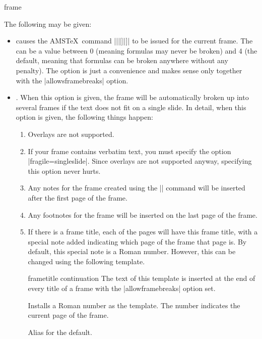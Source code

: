 \begin{environment}{{frame}%
    }
\begin{frame}[<+->][plain]
\begin{frame}[plain]
  The following  may be given:
  \begin{itemize}
  \item
     causes the AMS\TeX\ command
    |\allowdisplaybreaks||[||]| to be issued
    for the current frame. The  can be a
    value between 0 (meaning formulas may never be broken) and 4 (the
    default, meaning that formulas can be broken anywhere without any
    penalty). The option is just a convenience and makes sense only
    together with the |allowsframebreaks| option.  
  \item
    . When this option is
    given, the frame will be automatically broken up into several
    frames if the text does not fit on a single slide. In detail, when this
    option is given, the following things happen:
    \begin{enumerate}
    \item
      Overlays are not supported.
    \item
      If your frame contains verbatim text, you must specify the
      option |fragile=singleslide|. Since overlays are not supported
      anyway, specifying this option never hurts.
    \item
      Any notes for the frame created using the |\note| command will
      be inserted after the first page of the frame.
    \item
      Any footnotes for the frame will be inserted on the last page of
      the frame.
    \item
      If there is a frame title, each of the pages will have this
      frame title, with a special note added indicating which page of
      the frame that page is. By default, this special note is a
      Roman number. However, this can be changed using the following
      template.
      \begin{element}{frametitle continuation}\yes\yes\yes
        The text of this template is inserted at the end of every
        title of a frame with the |allowframebreaks| option set.
        \begin{templateoptions}
          Installs a Roman number as the template. The number
          indicates the current page of the frame.
          
          Alias for the default.
          

\end{templateoptions}
\end{element}
\end{enumerate}
\end{itemize}
\end{frame}
\end{frame}
\end{environment}

